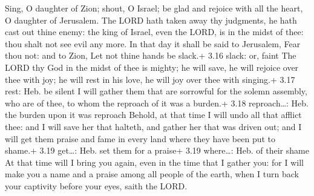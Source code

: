  Sing, O daughter of Zion; shout, O Israel; be glad and
rejoice with all the heart, O daughter of Jerusalem.  The
LORD hath taken away thy judgments, he hath cast out thine enemy: the
king of Israel, even the LORD, is in the midst of thee: thou shalt not
see evil any more.  In that day it shall be said to
Jerusalem, Fear thou not: and to Zion, Let not thine hands be slack.+
3.16 slack: or, faint  The LORD thy God in the midst of
thee is mighty; he will save, he will rejoice over thee with joy; he
will rest in his love, he will joy over thee with singing.+ 3.17 rest:
Heb. be silent  I will gather them that are sorrowful for
the solemn assembly, who are of thee, to whom the reproach of it was a
burden.+ 3.18 reproach\ldots: Heb. the burden upon it was reproach
 Behold, at that time I will undo all that afflict thee:
and I will save her that halteth, and gather her that was driven out;
and I will get them praise and fame in every land where they have been
put to shame.+ 3.19 get\ldots: Heb. set them for a praise+ 3.19
where\ldots: Heb. of their shame  At that time will I
bring you again, even in the time that I gather you: for I will make you
a name and a praise among all people of the earth, when I turn back your
captivity before your eyes, saith the LORD.

